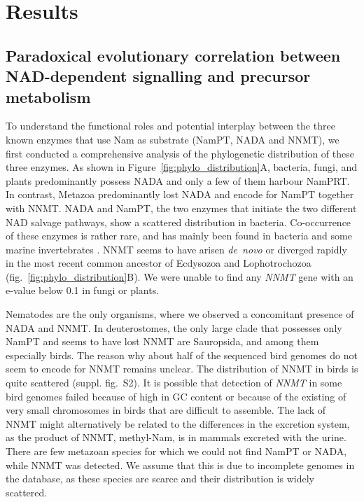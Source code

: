 
\section{Results}

\subsection{Paradoxical evolutionary correlation between NAD-dependent signalling and precursor metabolism}


To understand the functional roles and potential interplay between the three known enzymes that use Nam as substrate (NamPT, NADA and NNMT), we first conducted a comprehensive analysis of the phylogenetic distribution of these three enzymes.  As shown in Figure~\ref{fig:phylo_distribution}A, bacteria, fungi, and plants predominantly possess NADA and only a few of them harbour NamPRT. In contrast, Metazoa predominantly lost NADA and encode for NamPT together with NNMT. NADA and NamPT, the  two enzymes that initiate the two different NAD salvage pathways,  show a scattered distribution in bacteria. Co-occurrence of these enzymes is rather rare, and has mainly been found in bacteria \cite{Gazzaniga2009} and some marine invertebrates \cite{Gossmann2012FEBS}. 
NNMT seems to have arisen \textit{de~novo} or diverged rapidly in the most recent common ancestor of Ecdysozoa and Lophotrochozoa (fig.~\ref{fig:phylo_distribution}B). We were unable to find any \textit{NNMT} gene with an e-value below 0.1 in fungi or plants.

Nematodes are the only organisms, where we observed a concomitant presence of NADA and NNMT. In deuterostomes, the only large clade that possesses only NamPT and seems to have lost NNMT are Sauropsida, and among them especially birds. The reason why about half of the sequenced bird genomes do not seem to encode for NNMT remains unclear. The distribution of NNMT in birds is quite scattered (suppl. fig.~S2). It is possible that detection of \textit{NNMT} in some bird genomes failed because  of high in GC content \cite{Hron2015} or because of the existing of very small chromosomes in birds that are difficult to assemble. The lack of NNMT might alternatively be related to the differences in the excretion system, as the product of NNMT, methyl-Nam, is in mammals excreted with the urine. There are few metazoan species for which we could not find NamPT or NADA, while NNMT was detected. We assume that this is due to incomplete genomes in the database, as these species are scarce and their distribution is widely scattered.

